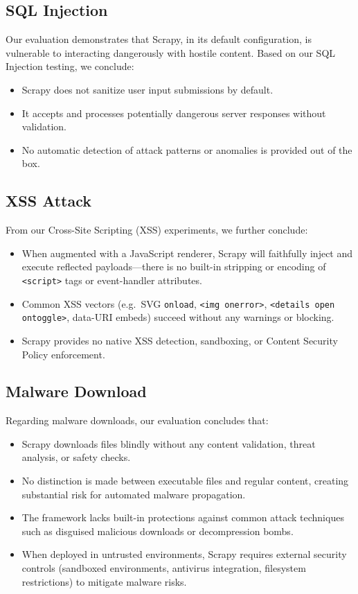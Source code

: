 \subsection{SQL Injection}
Our evaluation demonstrates that Scrapy, in its default configuration, is vulnerable to interacting dangerously with hostile content.  Based on our SQL Injection testing, we conclude:
\begin{itemize}
    \item Scrapy does not sanitize user input submissions by default.
    \item It accepts and processes potentially dangerous server responses without validation.
    \item No automatic detection of attack patterns or anomalies is provided out of the box.
  \end{itemize}

\subsection{XSS Attack}
From our Cross-Site Scripting (XSS) experiments, we further conclude:

\begin{itemize}
  \item When augmented with a JavaScript renderer, Scrapy will faithfully inject and execute reflected payloads—there is no built-in stripping or encoding of \texttt{<script>} tags or event-handler attributes.
  \item Common XSS vectors (e.g.\ SVG \texttt{onload}, \texttt{<img onerror>}, \texttt{<details open ontoggle>}, data-URI embeds) succeed without any warnings or blocking.
  \item Scrapy provides no native XSS detection, sandboxing, or Content Security Policy enforcement.
\end{itemize}


\subsection{Malware Download}
Regarding malware downloads, our evaluation concludes that:

\begin{itemize}
  \item Scrapy downloads files blindly without any content validation, threat analysis, or safety checks.
  \item No distinction is made between executable files and regular content, creating substantial risk for automated malware propagation.
  \item The framework lacks built-in protections against common attack techniques such as disguised malicious downloads or decompression bombs.
  \item When deployed in untrusted environments, Scrapy requires external security controls (sandboxed environments, antivirus integration, filesystem restrictions) to mitigate malware risks.
\end{itemize}


